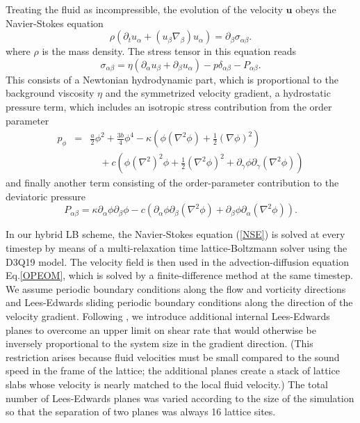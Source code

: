 \documentclass[8.5pt,twoside,twocolumn]{article}
\begin{document}
Treating the fluid as incompressible, the evolution of the velocity ${\bm u}$ obeys the Navier-Stokes equation
%
\begin{equation}\label{NSE}
\rho(\partial_t u_\alpha + (u_\beta \nabla_\beta) u_\alpha) = \partial_\beta \sigma_{\alpha \beta}. 
\end{equation}
%
where $\rho$ is the mass density. The stress tensor in this equation reads
%
\begin{equation}
\sigma_{\alpha \beta}=\eta (\partial_\alpha u_\beta + \partial_\beta u_\alpha)-p\delta_{\alpha\beta} - P_{\alpha \beta}. \label{fullstress}
\end{equation}
%
This consists of a Newtonian hydrodynamic part, which is proportional to the background viscosity $\eta$ and the symmetrized velocity gradient, a hydrostatic pressure term, which includes an isotropic stress contribution from the order parameter 
%
\begin{eqnarray}
p_{\phi}&=& \frac{a}{2}\phi^2+\frac{3b}{4}\phi^4-\kappa\left(\phi(\nabla^2\phi)+\frac{1}{2}({\nabla}\phi)^2\right)\nonumber\\
& &\quad+c\left(\phi(\nabla^2)^2\phi+\frac{1}{2}(\nabla^2\phi)^2+\partial_{\gamma}\phi\partial_\gamma(\nabla^2\phi)\right)
\end{eqnarray}
%
and finally another term consisting of the order-parameter contribution to the deviatoric pressure~\cite{Swift96,Yang76,Evans79} 
%
\begin{equation}
P_{\alpha \beta}=\kappa\partial_\alpha\phi\partial_\beta\phi -c \left(\partial_\alpha\phi\partial_\beta(\nabla^2\phi)+\partial_\beta\phi\partial_\alpha(\nabla^2\phi)\right).
\end{equation}

In our hybrid LB scheme, the Navier-Stokes equation (\ref{NSE}) is solved at every timestep by means of a multi-relaxation time lattice-Boltzmann solver \cite{dHumieres02,Adhikari05} using the D3Q19 model.
The velocity field is then used in the advection-diffusion equation Eq.\ref{OPEOM}, which is solved by a finite-difference method at the same timestep. We assume periodic boundary conditions along the flow and vorticity directions and Lees-Edwards sliding periodic boundary conditions\cite{leesedwards,Wagner02} along the direction of the velocity gradient.
Following \cite{Wagner02}, we introduce
additional internal Lees-Edwards planes to overcome an upper limit on shear rate that would otherwise be inversely proportional to the system size in the gradient direction. (This restriction arises because fluid velocities must be small compared to the sound speed in the frame of the lattice; the additional planes create a stack of lattice slabs whose velocity is nearly matched to the local fluid velocity.) 
The total number of Lees-Edwards planes was varied according to the size of the simulation so that the separation of two planes was always 16 lattice sites.  
\end{document}
